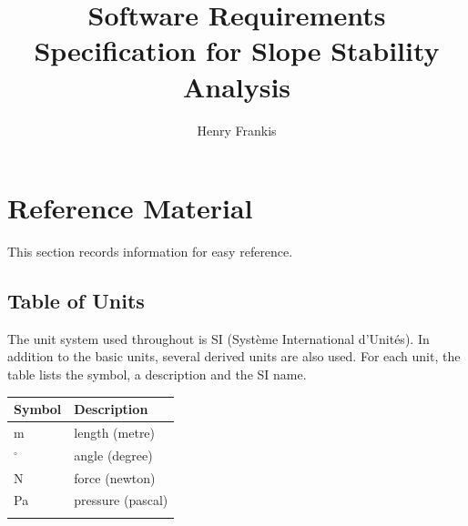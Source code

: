 \documentclass[12pt]{article}
\title{Software Requirements Specification for Slope Stability Analysis}
\author{Henry Frankis}
\begin{document}
\maketitle
\tableofcontents
\newpage
\section{Reference Material}
\label{Sec:RefeMate}
This section records information for easy reference.
\subsection{Table of Units}
\label{Sec:TablofUnit}
The unit system used throughout is SI (Syst\`{e}me International d'Unit\'{e}s). In addition to the basic units, several derived units are also used. For each unit, the table lists the symbol, a description and the SI name.
\begin{longtable*}{l l}
\toprule
Symbol & Description
\\
\midrule
m & length (metre)
\\
${}^{\circ}$ & angle (degree)
\\
N & force (newton)
\\
Pa & pressure (pascal)
\\
\bottomrule
\label{Table:TablofUnit}
\end{longtable*}
\end{document}
